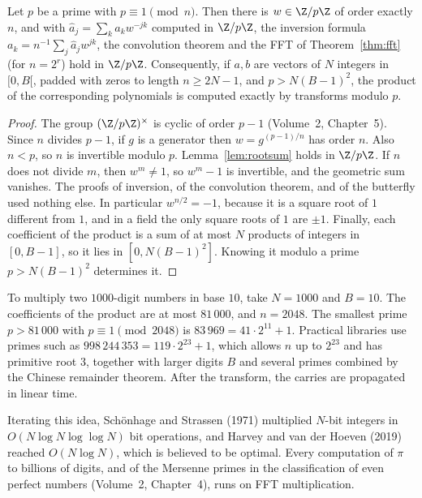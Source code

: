 \begin{theorem}\label{thm:ntt}
Let $p$ be a prime with $p\equiv1\pmod n$. Then there is $w\in\Z/p\Z$ of order exactly $n$, and with $\hat a_j=\sum_ka_kw^{-jk}$ computed in $\Z/p\Z$,
the inversion formula $a_k=n^{-1}\sum_j\hat a_jw^{jk}$, the convolution theorem and the FFT of Theorem~\ref{thm:fft} (for $n=2^r$) hold in $\Z/p\Z$.
Consequently, if $a,b$ are vectors of $N$ integers in $[0,B[$, padded with zeros to length $n\ge2N-1$, and $p>N(B-1)^2$, the product of the
corresponding polynomials is computed exactly by transforms modulo $p$.
\end{theorem}
\begin{proof}
The group $(\Z/p\Z)^\times$ is cyclic of order $p-1$ (Volume~2, Chapter~5). Since $n$ divides $p-1$, if $g$ is a generator then $w=g^{(p-1)/n}$ has order $n$. Also $n<p$, so $n$ is invertible modulo $p$. Lemma~\ref{lem:rootsum} holds in $\Z/p\Z$. If $n$ does not divide $m$, then $w^m\ne1$, so $w^m-1$ is invertible, and the geometric sum vanishes. The proofs of inversion, of the convolution theorem, and of the butterfly used nothing else. In particular $w^{n/2}=-1$, because it is a square root of $1$ different from $1$, and in a field the only square roots of $1$ are $\pm1$. Finally, each coefficient of the product is a sum of at most $N$ products of integers in $[0,B-1]$, so it lies in $[0,N(B-1)^2]$. Knowing it modulo a prime $p>N(B-1)^2$ determines it.
\end{proof}

To multiply two $1000$-digit numbers in base $10$, take $N=1000$ and $B=10$. The coefficients of the product are at most $81\,000$, and $n=2048$. The smallest prime $p>81\,000$ with $p\equiv1\pmod{2048}$ is $83\,969=41\cdot2^{11}+1$. Practical libraries use primes such as $998\,244\,353=119\cdot2^{23}+1$, which allows $n$ up to $2^{23}$ and has primitive root $3$, together with larger digits $B$ and several primes combined by the Chinese remainder theorem. After the transform, the carries are propagated in linear time.

\begin{remark}
Iterating this idea, Sch\"onhage and Strassen (1971) multiplied $N$-bit integers in $O(N\log N\log\log N)$ bit operations, and Harvey and van der Hoeven (2019) reached $O(N\log N)$, which is believed to be optimal. Every computation of $\pi$ to billions of digits, and of the Mersenne primes in the classification of even perfect numbers (Volume~2, Chapter~4), runs on FFT multiplication.
\end{remark}

